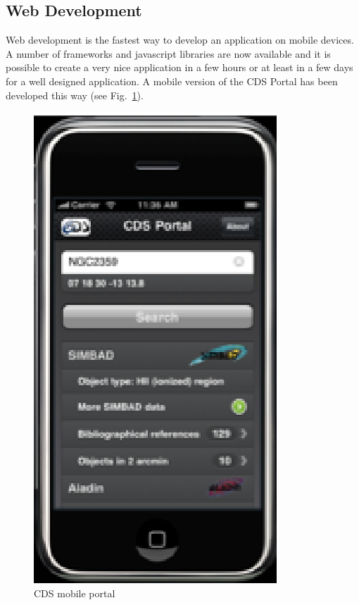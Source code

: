 \subsection{Web Development}
Web development is the fastest way to develop an application on mobile devices. A number of frameworks and javascript libraries are now available and it is possible to create a very nice application in a few hours or at least in a few days for a well designed application. A mobile version of the CDS Portal has been developed this way (see Fig.~\ref{O28:1}).

\begin{figure}[h] \center
\includegraphics[scale=0.7]{part5/Schaaff_O28/O28_f4.eps}
\caption{CDS mobile portal} 
\label{O28:1}
\end{figure}

